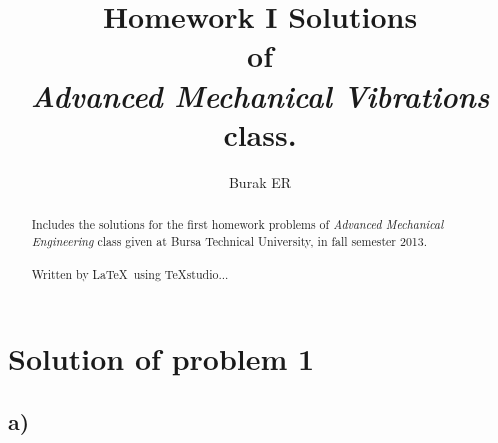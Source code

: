 \documentclass[]{report}
\title{Homework I Solutions \\ of \\ \emph{Advanced Mechanical Vibrations} class.}
\author{Burak ER}
\begin{document}
\maketitle
\begin{abstract}
Includes the solutions for the first homework problems of \emph{Advanced Mechanical Engineering} class given at Bursa Technical University, in fall semester 2013.
\\
\\
Written by \LaTeX ~using TeXstudio...
\end{abstract}
\section*{Solution of problem 1}
\subsection*{a)}
\end{document}
